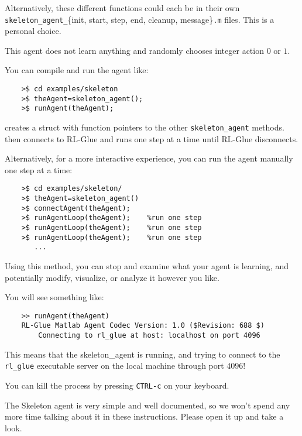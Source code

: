 \documentclass[11pt]{article}
\begin{document}
Alternatively, these different functions could each be in their own \texttt{skeleton\_agent\_}\{init, start, step, end, cleanup, message\}\texttt{.m} files.  This is a personal choice.

This agent does not learn anything and randomly chooses integer action $0$ or $1$.  

You can compile and run the agent like:
\begin{verbatim}
	>$ cd examples/skeleton
	>$ theAgent=skeleton_agent();
	>$ runAgent(theAgent);
\end{verbatim}

 creates a struct with function pointers to the other \texttt{skeleton\_agent} methods.   then
connects to RL-Glue and runs one step at a time until RL-Glue disconnects.

Alternatively, for a more interactive experience, you can run the agent manually one step at a time:
\begin{verbatim}
	>$ cd examples/skeleton/
	>$ theAgent=skeleton_agent()
	>$ connectAgent(theAgent);
	>$ runAgentLoop(theAgent);    %run one step
	>$ runAgentLoop(theAgent);    %run one step
	>$ runAgentLoop(theAgent);    %run one step
	   ...
\end{verbatim}

Using this method, you can stop and examine what your agent is learning, and potentially modify, visualize, or analyze it however you like.

You will see something like:
\begin{verbatim}
	>> runAgent(theAgent)
	RL-Glue Matlab Agent Codec Version: 1.0 ($Revision: 688 $)
	    Connecting to rl_glue at host: localhost on port 4096
\end{verbatim}

This means that the skeleton\_agent is running, and trying to connect to the \texttt{rl\_glue} executable server on the local machine through port $4096$! 

You can kill the process by pressing \texttt{CTRL-c} on your keyboard.


The Skeleton agent is very simple and well documented, so we won't spend any more time talking about it in these instructions.
Please open it up and take a look.
\end{document}
